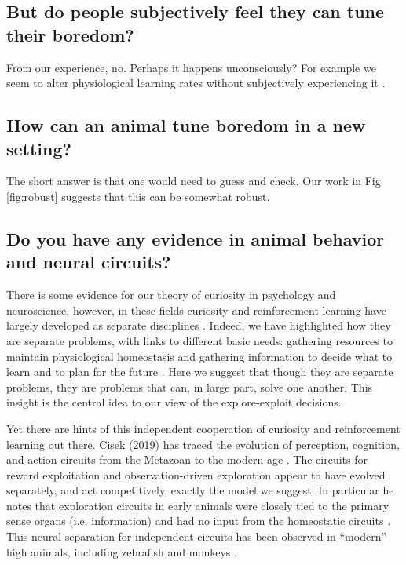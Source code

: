 \subsection*{But do people subjectively feel they can tune their boredom?}
From our experience, no. Perhaps it happens unconsciously? For example we seem to alter physiological learning rates without subjectively experiencing it \cite{Behrens2007}.


\subsection*{How can an animal tune boredom in a new setting?}
The short answer is that one would need to guess and check. Our work in Fig \ref{fig:robust} suggests that this can be somewhat robust.


\subsection*{Do you have any evidence in animal behavior and neural circuits?}
There is some evidence for our theory of curiosity in psychology and neuroscience, however, in these fields curiosity and reinforcement learning have largely developed as separate disciplines \cite{Berlyne1950,Kidd2015,Sutton2018}. Indeed, we have highlighted how they are separate problems, with links to different basic needs: gathering resources to maintain physiological homeostasis \cite{Keramati2014,Juechems2019} and gathering information to decide what to learn and to plan for the future \cite{Valiant1984,Sutton2018}. Here we suggest that though they are separate problems, they are problems that can, in large part, solve one another. This insight is the central idea to our view of the explore-exploit decisions. 

Yet there are hints of this independent cooperation of curiosity and reinforcement learning out there. Cisek (2019) has traced the evolution of perception, cognition, and action circuits from the Metazoan to the modern age \cite{Cisek2019}. The circuits for reward exploitation and observation-driven exploration appear to have evolved separately, and act competitively, exactly the model we suggest. In particular he notes that exploration circuits in early animals were closely tied to the primary sense organs (i.e. information) and had no input from the homeostatic circuits \cite{Keramati2014,Cisek2019,Juechems2019}. This neural separation for independent circuits has been observed in ``modern'' high animals, including zebrafish \cite{Marques2019} and monkeys \cite{White2019,Wang2019}. 


